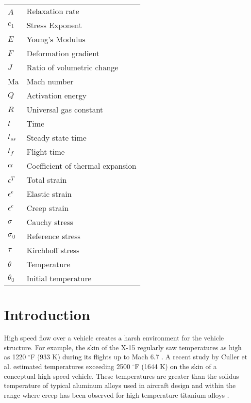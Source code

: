 \documentclass[conf]{new-aiaa}
\begin{document}
{\renewcommand\arraystretch{1.0}
\noindent\begin{longtable*}{@{}l @{\quad=\quad} l@{}}
$\bar{A}$    & Relaxation rate\\
$c_1$        & Stress Exponent\\
$E$          & Young's Modulus \\
$F$          & Deformation gradient\\
$J$          & Ratio of volumetric change\\
Ma           & Mach number\\
$Q$          & Activation energy\\
$R$          & Universal gas constant\\
$t$          & Time\\
$t_{ss}$     & Steady state time\\
$t_{f}$      & Flight time \\
$\alpha$     & Coefficient of thermal expansion\\
$\epsilon^T$ & Total strain\\
$\epsilon^e$ & Elastic strain\\
$\epsilon^c$ & Creep strain\\
$\sigma$     & Cauchy stress\\
$\sigma_0$   & Reference stress\\
$\tau$       & Kirchhoff stress\\
$\theta$     & Temperature\\
$\theta_0$   & Initial temperature
\end{longtable*}}

\section{Introduction}

High speed flow over a vehicle creates a harsh environment for 
the vehicle structure.
For example, the skin of the X-15 regularly saw temperatures
as high as 1220 $^{\circ}$F (933 K)
during its flights up to Mach 6.7
\cite{ kordes_structureal_heating_experiencs_on_the_x15_airplane}.
A recent study by Culler et al.
\cite{ culler_impact_of_FTS_coupling_on_response_prediction_hypersonic_skin_panels}
estimated temperatures exceeding 2500 $^\circ$F (1644 K) 
on the skin of a conceptual high speed vehicle.
These temperatures are greater than the solidus 
temperature of typical aluminum alloys used in aircraft design
\cite{ SAE_metals_and_alloys_in_the_unified_numbering_system}
and within the range where creep has been observed for 
high temperature titanium alloys 
\cite{
  evans_effects_of_alpha_case_formation_on_creep_fracture_properties_of_the_high_temperature_titanium_alloy_IMI834,
  lavina_creep_behavior_of_Ti6Al4V_from_450C_to_600C}.
\end{document}
